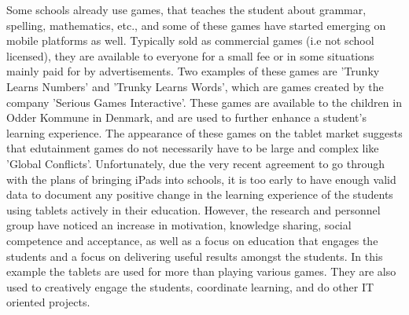 Some schools already use games, that teaches the student about grammar, spelling, mathematics, etc., and some of these games have started emerging on mobile platforms as well.
Typically sold as commercial games (i.e not school licensed), they are available to everyone for a small fee or in some situations mainly paid for by advertisements.
Two examples of these games are 'Trunky Learns Numbers' and 'Trunky Learns Words', which are games created by the company 'Serious Games Interactive'.
These games are available to the children in Odder Kommune in Denmark, and are used to further enhance a student's learning experience.\cite{odderipad}
The appearance of these games on the tablet market suggests that edutainment games do not necessarily have to be large and complex like 'Global Conflicts'.
Unfortunately, due the very recent agreement to go through with the plans of bringing iPads into schools, it is too early to have enough valid data to document any positive change in the learning experience of the students using tablets actively in their education.
However, the research and personnel group have noticed an increase in motivation, knowledge sharing, social competence and acceptance, as well as a focus on education that engages the students and a focus on delivering useful results amongst the students.\cite{odderipadpjece}
In this example the tablets are used for more than playing various games. They are also used to creatively engage the students, coordinate learning, and do other IT oriented projects.\cite{odderipadpjece}